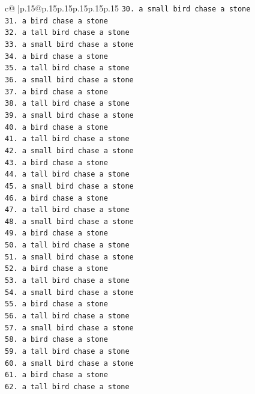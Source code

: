 \documentclass{article}
\begin{document}
{\begin{supertabular}{c@{$\;$}|p{.15\linewidth}@{}p{.15\linewidth}p{.15\linewidth}p{.15\linewidth}p{.15\linewidth}p{.15\linewidth}}
{{{\texttt{30. a small bird chase a stone} \\
\texttt{31. a bird chase a stone} \\
\texttt{32. a tall bird chase a stone} \\
\texttt{33. a small bird chase a stone} \\
\texttt{34. a bird chase a stone} \\
\texttt{35. a tall bird chase a stone} \\
\texttt{36. a small bird chase a stone} \\
\texttt{37. a bird chase a stone} \\
\texttt{38. a tall bird chase a stone} \\
\texttt{39. a small bird chase a stone} \\
\texttt{40. a bird chase a stone} \\
\texttt{41. a tall bird chase a stone} \\
\texttt{42. a small bird chase a stone} \\
\texttt{43. a bird chase a stone} \\
\texttt{44. a tall bird chase a stone} \\
\texttt{45. a small bird chase a stone} \\
\texttt{46. a bird chase a stone} \\
\texttt{47. a tall bird chase a stone} \\
\texttt{48. a small bird chase a stone} \\
\texttt{49. a bird chase a stone} \\
\texttt{50. a tall bird chase a stone} \\
\texttt{51. a small bird chase a stone} \\
\texttt{52. a bird chase a stone} \\
\texttt{53. a tall bird chase a stone} \\
\texttt{54. a small bird chase a stone} \\
\texttt{55. a bird chase a stone} \\
\texttt{56. a tall bird chase a stone} \\
\texttt{57. a small bird chase a stone} \\
\texttt{58. a bird chase a stone} \\
\texttt{59. a tall bird chase a stone} \\
\texttt{60. a small bird chase a stone} \\
\texttt{61. a bird chase a stone} \\
\texttt{62. a tall bird chase a stone} \\
}}}
\end{supertabular}}
\end{document}
